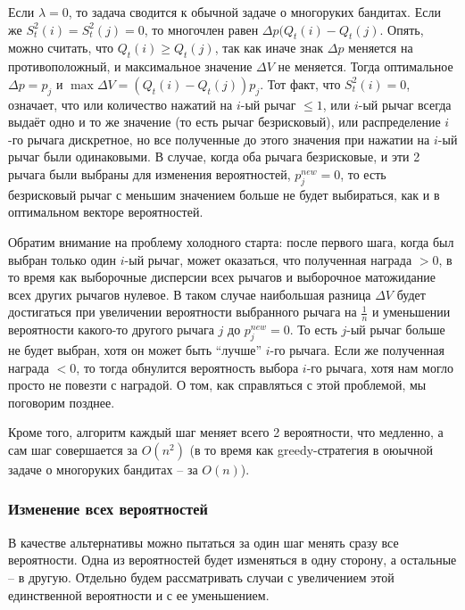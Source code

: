 Если $\lambda = 0$, то задача сводится к обычной задаче о многоруких бандитах. Если же $S_t^2(i) = S_t^2(j) = 0$, то многочлен равен $\Delta p (Q_t(i) - Q_t(j)$. Опять, можно считать, что $Q_t(i) \geq Q_t(j)$, так как иначе знак $\Delta p$ меняется на противоположный, и максимальное значение $\Delta V$ не меняется. Тогда оптимальное $\Delta p = p_j$ и $\max \Delta V = (Q_t(i) - Q_t(j)) p_j$. Тот факт, что $S_t^2(i) = 0$, означает, что или количество нажатий на $i$-ый рычаг $ \leq 1$, или $i$-ый рычаг всегда выдаёт одно и то же значение (то есть рычаг безрисковый), или распределение $i$-го рычага дискретное, но все полученные до этого значения при нажатии на $i$-ый рычаг были одинаковыми. В случае, когда оба рычага безрисковые, и эти 2 рычага были выбраны для изменения вероятностей, $p_j^{new} = 0$, то есть безрисковый рычаг с меньшим значением больше не будет выбираться, как и в оптимальном векторе вероятностей. 

Обратим внимание на проблему холодного старта: после первого шага, когда был выбран только один $i$-ый рычаг, может оказаться, что полученная награда $> 0$, в то время как выборочные дисперсии всех рычагов и выборочное матожидание всех других рычагов нулевое. В таком случае наибольшая разница $\Delta V$ будет достигаться при увеличении вероятности выбранного рычага на $\frac{1}{n}$ и уменьшении вероятности какого-то другого рычага $j$ до $p_j^{new} = 0$. То есть $j$-ый рычаг больше не будет выбран, хотя он может быть ``лучше'' $i$-го рычага. Если же полученная награда $< 0$, то тогда обнулится вероятность выбора $i$-го рычага, хотя нам могло просто не повезти с наградой. О том, как справляться с этой проблемой, мы поговорим позднее.

Кроме того, алгоритм каждый шаг меняет всего 2 вероятности, что медленно, а сам шаг совершается за $O(n^2)$ (в то время как greedy-стратегия в оюычной задаче о многоруких бандитах -- за $O(n)$).
    
\iffalse
\subsubsection{Изменение всех вероятностей}

В качестве альтернативы можно пытаться за один шаг менять сразу все вероятности. Одна из вероятностей будет изменяться в одну сторону, а остальные -- в другую. Отдельно будем рассматривать случаи с увеличением этой единственной вероятности и с ее уменьшением.
    
